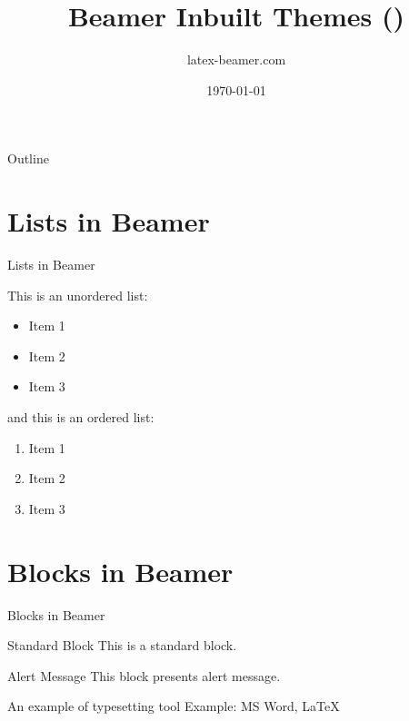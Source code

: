 \documentclass{beamer}
\title{Beamer Inbuilt Themes (\beamertheme)}
\author{latex-beamer.com}
\date{\today}
\begin{document}
\begin{frame}
    \titlepage 
\end{frame}

\logo{}


\begin{frame}{Outline}
    \tableofcontents
\end{frame}


\section{Lists in Beamer}
\begin{frame}{Lists in Beamer}

This is an unordered list:
\begin{itemize}
    \item Item 1
    \item Item 2
    \item Item 3
\end{itemize}

and this is an ordered list:
\begin{enumerate}
    \item Item 1
    \item Item 2
    \item Item 3
\end{enumerate}

\end{frame}


\section{Blocks in Beamer}
\begin{frame}{Blocks in Beamer}
    \begin{block}{Standard Block}
        This is a standard block.
    \end{block}
    \begin{alertblock}{Alert Message}
        This block presents alert message.
    \end{alertblock}
    \begin{exampleblock}{An example of typesetting tool}
        Example: MS Word, \LaTeX{}
    \end{exampleblock}
\end{frame} 
\end{document}
